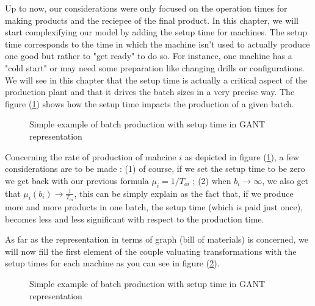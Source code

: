 Up to now, our considerations were only focused on the operation times for making products and the reciepee of the final product. In this chapter, we will start complexifying our model by adding the setup time for machines. The setup time corresponds to the time in which the machine isn't used to actually produce one good but rather to "get ready" to do so. For instance, one machine has a "cold start" or may need some preparation like changing drills or configurations. We will see in this chapter that the setup time is actually a critical aspect of the production plant and that it drives the batch sizes in a very precise way. The figure (\ref{setup:gant_ex}) shows how the setup time impacts the production of a given batch.

\begin{figure}[h!]
    \centering
    \caption{\label{setup:gant_ex}Simple example of batch production with setup time in GANT representation}
\end{figure}

Concerning the rate of production of mahcine $i$ as depicted in figure (\ref{setup:gant_ex}), a few considerations are to be made : (1) of course, if we set the setup time to be zero we get back with our previous formula $\mu_i = 1/T_{oi}$ ; (2) when $b_i\rightarrow\infty$, we also get that $\mu_i(b_i)\rightarrow\frac{1}{T_{oi}}$, this can be simply explain as the fact that, if we produce more and more products in one batch, the setup time (which is paid just once), becomes less and less significant with respect to the production time.

As far as the representation in terms of graph (bill of materials) is concerned, we will now fill the first element of the couple valuating transformations with the setup times for each machine as you can see in figure (\ref{setup:graph_setup}).

\begin{figure}[h!]
    \centering
    \caption{\label{setup:graph_setup}Simple example of batch production with setup time in GANT representation}
\end{figure}

